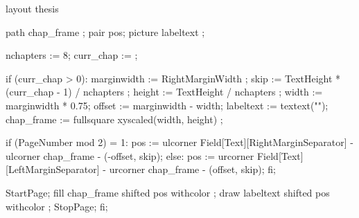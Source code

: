 \startenvironment layout
\product thesis


\usemodule[units]
\usemodule[bibtex]



\setupinteraction[state=start]
\setuppapersize[ThesisSize]
\setuplayout[location=middle, width=13.0cm, height=19.6cm, 
             topspace=1.7cm, bottomspace=1.7cm, margin=2.0cm, 
             header=0.5cm, footer=0.5cm]

{}

\setuppagenumbering[alternative=doublesided, location=right]

\definecolor[gray][s=0.25]
\definecolor[lightgray][s=0.75]
    path chap_frame ;
    pair pos;  
    picture labeltext ;
  
    nchapters := 8;
    curr_chap :=  ; 
  
    if (curr_chap > 0):
       marginwidth := RightMarginWidth ;
       skip   := TextHeight * (curr_chap - 1) / nchapters ;
       height := TextHeight / nchapters ;
       width  := marginwidth * 0.75;
       offset := marginwidth - width;
       labeltext := textext("\ssbfb \lightgray \getmarking[chapternumber]");
       chap_frame := fullsquare xyscaled(width, height) ;

       if (PageNumber mod 2) = 1:
           pos := ulcorner Field[Text][RightMarginSeparator] -
                  ulcorner chap_frame - (-offset, skip);
       else:
           pos := urcorner Field[Text][LeftMarginSeparator] -
                  urcorner chap_frame - (offset, skip);
       fi;

        StartPage;
            fill chap_frame shifted pos withcolor ;
            draw labeltext shifted pos withcolor ;
        StopPage;
    fi;
\stopuseMPgraphic

\setupbackgrounds[page][background=thumbindex]


